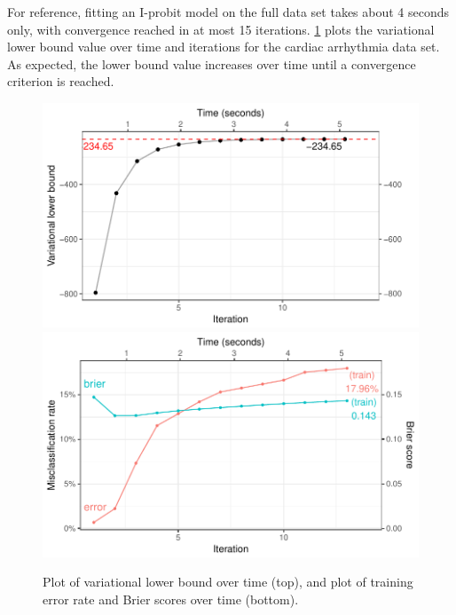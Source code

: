 \documentclass[showframe,11pt]{report}\usepackage[]{graphicx}\usepackage{xcolor}
\newenvironment{knitrout}{}{} %
\begin{document}
For reference, fitting an I-probit model on the full data set takes about 4 seconds only, with convergence reached in at most 15 iterations.
\cref{fig:cardiac.mod.full.plot} plots the variational lower bound value over time and iterations for the cardiac arrhythmia data set.
As expected, the lower bound value increases over time until a convergence criterion is reached.




\begin{knitrout}
\color{fgcolor}\begin{figure}[htb]

{\centering \includegraphics[width=0.785\linewidth]{figure/05-cardiac_mod_full_plot-1} 
\includegraphics[width=0.785\linewidth]{figure/05-cardiac_mod_full_plot-2} 

}

\caption[Plot of variational lower bound, training error rate and Brier scores against time and iterations]{Plot of variational lower bound over time (top), and plot of training error rate and Brier scores over time (bottom).}\label{fig:cardiac.mod.full.plot}
\end{figure}


\end{knitrout}
\end{document}
